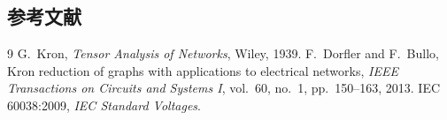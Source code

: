 \subsection{参考文献}
{\renewcommand{\section}[2]{}%
\begin{thebibliography}{9}\small
{} G.~Kron, \emph{Tensor Analysis of Networks}, Wiley, 1939.
 F.~Dorfler and F.~Bullo, Kron reduction of graphs with applications to electrical networks,
\emph{IEEE Transactions on Circuits and Systems I}, vol.~60, no.~1, pp.~150--163, 2013.
 IEC 60038:2009, \emph{IEC Standard Voltages}.
\end{thebibliography}}


